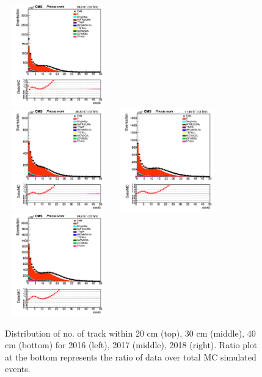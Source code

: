 \documentclass{cernatlasnote}
\begin{document}
\begin{figure}[htp]
 \includegraphics[width=4.6cm, height=4.4cm]{images/emu_channel/2018/18_Range_0pt2_1pt8/track_ntrk30_TRK_Linear.png}\\
\includegraphics[width=4.6cm, height=4.4cm]{images/emu_channel/2016/16_Range_0pt2_1pt8/track_ntrk40_TRK_Linear.png }
\includegraphics[width=4.6cm, height=4.4cm]{images/emu_channel/2017/17_Range_0pt2_1pt8/track_ntrk40_TRK_Linear.png }
 \includegraphics[width=4.6cm, height=4.4cm]{images/emu_channel/2018/18_Range_0pt2_1pt8/track_ntrk40_TRK_Linear.png }\\
  \caption{Distribution of no. of track within 20 cm (top), 30 cm (middle), 40 cm (bottom) for 2016 (left), 2017 (middle), 2018 (right). Ratio plot at the bottom represents the ratio of data over total MC simulated events.}
 \label{fig:L0DATAMC}
  \end{figure}
\end{document}
